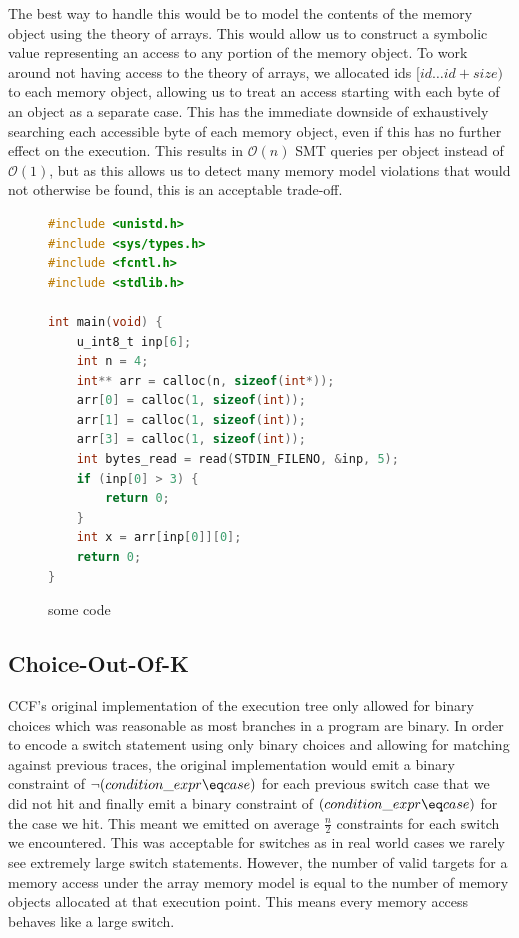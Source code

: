 \documentclass[12pt,twoside]{report}
\begin{document}
The best way to handle this would be to model the contents of the memory object using the theory of arrays. This would allow us to construct a symbolic value representing an access to any portion of the memory object.
To work around not having access to the theory of arrays, we allocated ids $[id \dots id + size)$ to each memory object, allowing us to treat an access starting with each byte of an object as a separate case. This has the immediate downside of exhaustively searching each accessible byte of each memory object, even if this has no further effect on the execution. This results in $\mathcal{O}(n)$ SMT queries per object instead of $\mathcal{O}(1)$, but as this allows us to detect many memory model violations that would not otherwise be found, this is an acceptable trade-off.

\begin{figure}
    \centering
    \begin{lstlisting}[language=C]
#include <unistd.h>
#include <sys/types.h>
#include <fcntl.h>
#include <stdlib.h>

int main(void) {
    u_int8_t inp[6];
    int n = 4;
    int** arr = calloc(n, sizeof(int*));
    arr[0] = calloc(1, sizeof(int));
    arr[1] = calloc(1, sizeof(int));
    arr[3] = calloc(1, sizeof(int));
    int bytes_read = read(STDIN_FILENO, &inp, 5);
    if (inp[0] > 3) {
        return 0;
    }
    int x = arr[inp[0]][0];
    return 0;
}
\end{lstlisting}
    \caption{some code}
    \label{DoubleIndirection}
\end{figure}



\subsection{Choice-Out-Of-K}

CCF's original implementation of the execution tree only allowed for binary choices which was reasonable as most branches in a program are binary. In order to encode a switch statement using only binary choices and allowing for matching against previous traces, the original implementation would emit a binary constraint of $\neg{(condition\_expr \eq case)}$ for each previous switch case that we did not hit and finally emit a binary constraint of $(condition\_expr \eq case)$ for the case we hit. This meant we emitted on average $\frac{n}{2}$ constraints for each switch we encountered. This was acceptable for switches as in real world cases we rarely see extremely large switch statements. However, the number of valid targets for a memory access under the array memory model is equal to the number of memory objects allocated at that execution point. This means every memory access behaves like a large switch.
\end{document}
